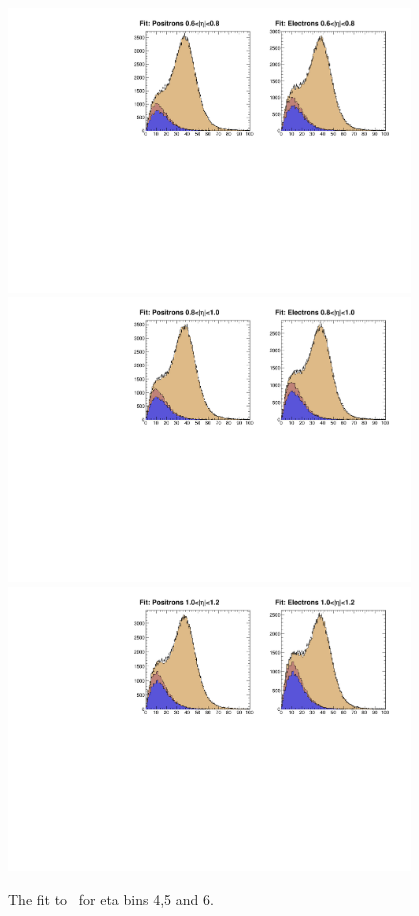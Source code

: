 \begin{figure}
  \begin{center}
\includegraphics[width=0.95\textwidth]{data_3.pdf} \\
\includegraphics[width=0.95\textwidth]{data_4.pdf} \\
\includegraphics[width=0.95\textwidth]{data_5.pdf}
 \caption{  \label{fig:data2} The fit to \MET\ for eta bins 4,5 and 6.}
  \end{center}
\end{figure}

